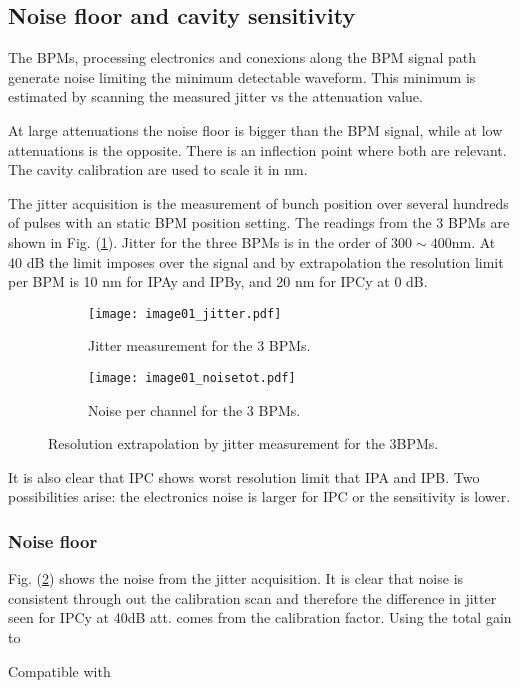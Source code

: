 \subsection{Noise floor and cavity sensitivity}
The BPMs, processing electronics and conexions along the BPM signal path generate noise limiting the minimum detectable waveform. This minimum is estimated by scanning the measured jitter vs the attenuation value.\par
At large attenuations the noise floor is bigger than the BPM signal, while at low attenuations is the opposite. There is an inflection point where both are relevant. The cavity calibration are used to scale it in nm.\par
The jitter acquisition is the measurement of bunch position over several hundreds of pulses with an static BPM position setting. 
The readings from the 3 BPMs are shown in Fig. (\ref{f:resojitter}). Jitter for the three BPMs is in the order of $300\sim400$nm. At 40 dB the limit imposes over the signal and by extrapolation the resolution limit per BPM is 10 nm for IPAy and IPBy, and 20 nm for IPCy at 0 dB.\par
\begin{figure}[!htb]
\centering\hspace*{-0.6cm}
\begin{subfigure}{0.4\textwidth}
 \texttt{[image: image01\_jitter.pdf]}\caption{Jitter measurement for the 3 BPMs.}\label{f:resojitter}
\end{subfigure}\hspace*{1cm}
\begin{subfigure}{0.4\textwidth}
 \texttt{[image: image01\_noisetot.pdf]}\caption{Noise per channel for the 3 BPMs.}\label{f:resonoisetot}
\end{subfigure}\caption{Resolution extrapolation by jitter measurement for the 3BPMs.}\label{f:resojitternoise}
\end{figure}
It is also clear that IPC shows worst resolution limit that IPA and IPB. Two possibilities arise: the electronics noise is larger for IPC or the sensitivity is lower.\par 
\subsubsection{Noise floor}
Fig. (\ref{f:resonoisetot}) shows the noise from the jitter acquisition. It is clear that noise is consistent through out the calibration scan and therefore the difference in jitter seen for IPCy at 40dB att. comes from the calibration factor. Using the total gain to \par
Compatible with \cite{PhysRevSTAB.11.062801}



